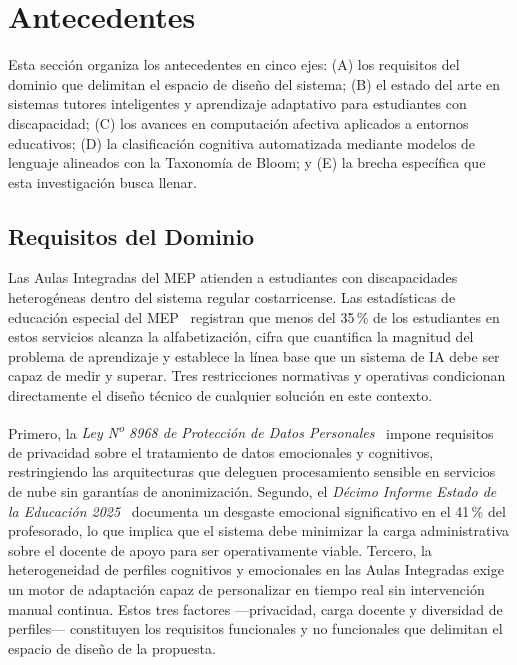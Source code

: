 
\section{Antecedentes}

Esta sección organiza los antecedentes en cinco ejes: (A) los requisitos del
dominio que delimitan el espacio de diseño del sistema; (B) el estado del arte en
sistemas tutores inteligentes y aprendizaje adaptativo para estudiantes con
discapacidad; (C) los avances en computación afectiva aplicados a entornos
educativos; (D) la clasificación cognitiva automatizada mediante modelos de
lenguaje alineados con la Taxonomía de Bloom; y (E) la brecha específica que
esta investigación busca llenar.

\subsection{Requisitos del Dominio}

Las Aulas Integradas del MEP atienden a estudiantes con discapacidades
heterogéneas dentro del sistema regular costarricense. Las estadísticas de
educación especial del MEP~\cite{MEP2022stats} registran que menos del 35\,\%
de los estudiantes en estos servicios alcanza la alfabetización, cifra que
cuantifica la magnitud del problema de aprendizaje y establece la línea base
que un sistema de IA debe ser capaz de medir y superar. Tres restricciones
normativas y operativas condicionan directamente el diseño técnico de cualquier
solución en este contexto.

Primero, la \textit{Ley N\textsuperscript{o} 8968 de Protección de Datos
Personales}~\cite{Ley8968} impone requisitos de privacidad sobre el tratamiento
de datos emocionales y cognitivos, restringiendo las arquitecturas que deleguen
procesamiento sensible en servicios de nube sin garantías de anonimización.
Segundo, el \textit{Décimo Informe Estado de la Educación 2025}~\cite{PEN2025}
documenta un desgaste emocional significativo en el 41\,\% del profesorado,
lo que implica que el sistema debe minimizar la carga administrativa sobre el
docente de apoyo para ser operativamente viable. Tercero, la heterogeneidad de
perfiles cognitivos y emocionales en las Aulas Integradas exige un motor de
adaptación capaz de personalizar en tiempo real sin intervención manual
continua. Estos tres factores ---privacidad, carga docente y diversidad de
perfiles--- constituyen los requisitos funcionales y no funcionales que delimitan
el espacio de diseño de la propuesta.

